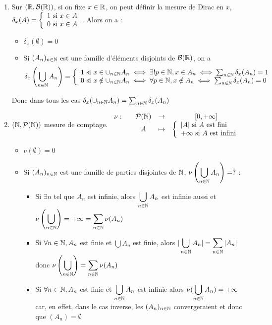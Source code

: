 \documentclass[]{report}
\begin{document}
\begin{ex}
    \begin{enumerate}
        \item Sur $(\mathbb{R},\mathcal{B}(\mathbb{R}))$, si on fixe $x\in\mathbb{R}$, on peut définir la mesure de Dirac en $x$, $\delta_x(A)=\left\{\begin{array}{ll} 1\text{ si }x\in A\\0\text{ si }x\in A \end{array} \right.$. Alors on a : 
        \begin{itemize}
            \item $\delta_x(\emptyset)=0$
            \item Si $(A_n)_{n\in\mathbb{N}}$ est une famille d'éléments disjoints de $\mathcal{B}(\mathbb{R})$, on a $$\delta_x\left(\bigcup_{n\in\mathbb{N}}A_n\right)=\left\{\begin{array}{ll} 1\text{ si }x\in\cup_{n\in\mathbb{N}}A_n\iff \exists!p\in\mathbb{N},x\in A_n\iff\sum_{n\in\mathbb{N}}\delta_x(A_n)=1\\
            0\text{ si }x\notin\cup_{n\in\mathbb{N}}A_n\iff \forall p\in\mathbb{N},x\notin A_n\iff\sum_{n\in\mathbb{N}}\delta_x(A_n)=0 \end{array} \right.$$
        \end{itemize}
        Donc dans tous les cas $\delta_x(\cup_{n\in\mathbb{N}}A_n)=\sum_{n\in\mathbb{N}}\delta_x(A_n)$
        \item $(\mathbb{N},\mathcal{P}(\mathbb{N}))$ mesure de comptage. $\begin{array}{ccccc} \nu : & & \mathcal{P}(\mathbb{N}) & \to & [0,+\infty] \\ & & A & \mapsto & \left\{\begin{array}{ll} |A|\text{ si }A\text{ est fini}\\+\infty\text{ si }A\text{ est infini} \end{array} \right. \end{array}$
        \begin{itemize}
            \item $\nu(\emptyset)=0$
            \item Si $(A_n)_{n\in\mathbb{N}}$ est une famille de parties disjointes de $\mathbb{N}$, $\displaystyle{\nu\left(\bigcup_{n\in\mathbb{N}}A_n\right)}=?$ : \begin{itemize}
                \item Si $\exists n$ tel que $A_n$ est infinie, alors $\displaystyle{\bigcup_{n\in\mathbb{N}}A_n}$ est infinie aussi et $\displaystyle{\nu\left( \bigcup_{{n\in\mathbb{N}}} \right)=+\infty=\sum_{{n\in\mathbb{N}}}\nu(A_n)}$
                \item Si $\forall{n\in\mathbb{N}},A_n$ est finie et $\bigcup A_n$ est finie, alors $\displaystyle{|\bigcup_{{n\in\mathbb{N}}}A_n|=\sum_{{n\in\mathbb{N}}}|A_n|}$ donc $\displaystyle{\nu\left( \bigcup_{{n\in\mathbb{N}}} \right)=\sum_{{n\in\mathbb{N}}}\nu(A_n)}$
                \item Si $\forall{n\in\mathbb{N}},A_n$ est finie et $\displaystyle{\bigcup_{{n\in\mathbb{N}}}A_n}$ est infinie alors $\displaystyle{\nu(\bigcup_{{n\in\mathbb{N}}}A_n)=+\infty}$ car, en effet, dans le cas inverse, les $(A_n)_{{n\in\mathbb{N}}}$ convergeraient et donc que $(A_n)=\emptyset$ \apcr
            \end{itemize}
        \end{itemize}
    \end{enumerate}
\end{ex}
\end{document}
